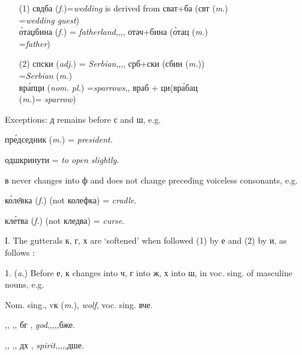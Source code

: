 \begin{itemize}
    \item[(1)] свдба (\emph{f.})=\emph{wedding} is derived
        from сват+ба (свт (\emph{m}.)\\
        \hspace*{3in}=\emph{wedding guest})\\
        \`{о}таџбина ({\it f.}) = \textit{fatherland}\quad ,,\qquad,, \quad
        отач+бина (\`{о}тац ({\it m.})\\
        \hspace*{3in}=\emph{father})  
    \item[(2)] спски ({\it adj.}) =
        \emph{Serbian}\qquad,,\qquad,, \quad 
        срб+ски (сбин ({\it m.}))\\
        \hspace*{3in}=\emph{Serbian} ({\it m.})\\
        вр\'{а}пци ({\it nom. pl.}) =\emph{sparrows}\qquad,, \quad
        враб + ци\quad(вр\'{а}бац\\
        \hspace*{3in}({\it m.})= \emph{sparrow})
\end{itemize}

Exceptions: д remains before с and ш, e.g.

\qquad\qquad пр\'{е}дседник ({\it m.}) = \emph{president.}

\qquad\qquad одшкринути = \emph{to open slightly.}

в never changes into ф and does not change preceding voiceless consonants, e.g.

\qquad\qquad к\`{о}л\={е}вка ({\it f.}) (not колефка) = \textit{cradle}.

\qquad\qquad кл\'{е}тва ({\it f.}) (not кледва) = \textit{curse}.


I. The gutterals к, г, х are `softened' when followed (1) by е and (2) by и, as follows :
\newpage

1. ({\it a.}) Before е, к changes into ч, г into ж, х into ш, in voc. sing. of masculine nouns, e.g.

Nom. sing., vк ({\it m.}), \emph{wolf}, voc. sing. вче.

\quad,, \quad ,, \qquad бг \masc{}, \emph{god},\qquad,,\quad,,\quad бже.

\quad,, \quad ,, \qquad дх \masc{}, \emph{spirit},\quad,,\quad,,\quad дше.

